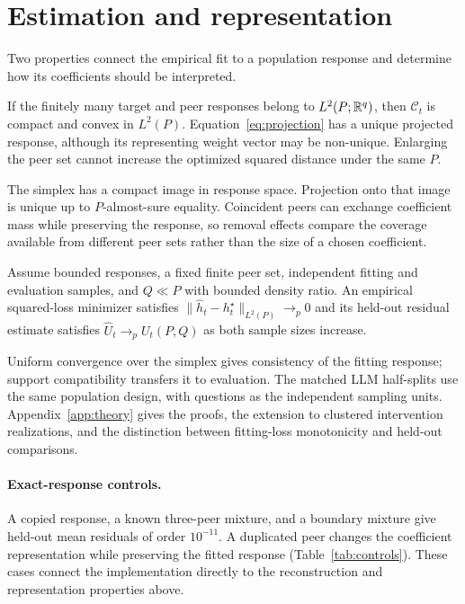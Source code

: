 \section{Estimation and representation}
\label{sec:measurement}

Two properties connect the empirical fit to a population response and determine how its coefficients should be interpreted.

\begin{proposition}
\label{prop:projection}
If the finitely many target and peer responses belong to $L^2(P;\mathbb{R}^q)$, then $\mathcal C_t$ is compact and convex in $L^2(P)$. Equation~\eqref{eq:projection} has a unique projected response, although its representing weight vector may be non-unique. Enlarging the peer set cannot increase the optimized squared distance under the same $P$.
\end{proposition}

The simplex has a compact image in response space. Projection onto that image is unique up to $P$-almost-sure equality. Coincident peers can exchange coefficient mass while preserving the response, so removal effects compare the coverage available from different peer sets rather than the size of a chosen coefficient.

\begin{proposition}
\label{prop:consistency}
Assume bounded responses, a fixed finite peer set, independent fitting and evaluation samples, and $Q\ll P$ with bounded density ratio. An empirical squared-loss minimizer satisfies $\|\widehat h_t-h_t^\star\|_{L^2(P)}\to_p0$ and its held-out residual estimate satisfies $\widehat U_t\to_p U_t(P,Q)$ as both sample sizes increase.
\end{proposition}

Uniform convergence over the simplex gives consistency of the fitting response; support compatibility transfers it to evaluation. The matched LLM half-splits use the same population design, with questions as the independent sampling units. Appendix~\ref{app:theory} gives the proofs, the extension to clustered intervention realizations, and the distinction between fitting-loss monotonicity and held-out comparisons.

\paragraph{Exact-response controls.}
A copied response, a known three-peer mixture, and a boundary mixture give held-out mean residuals of order $10^{-11}$. A duplicated peer changes the coefficient representation while preserving the fitted response (Table~\ref{tab:controls}). These cases connect the implementation directly to the reconstruction and representation properties above.


